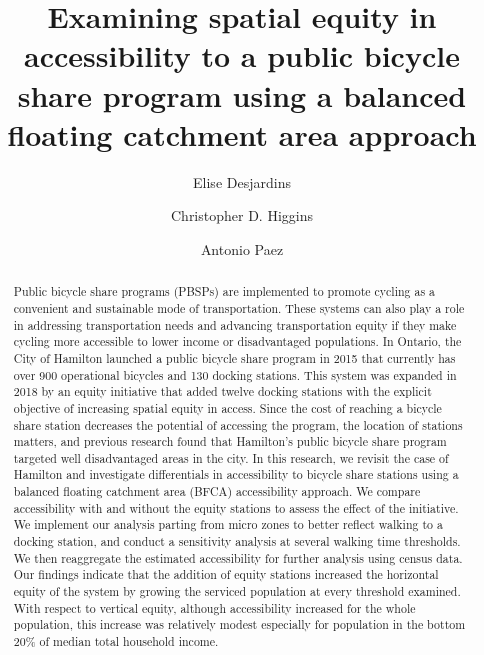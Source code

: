\documentclass[]{elsarticle} %
\begin{document}
\begin{frontmatter}

  \title{Examining spatial equity in accessibility to a public bicycle share
program using a balanced floating catchment area approach}
    \author[McMaster University]{Elise Desjardins}
    \author[University of Toronto Scarborough]{Christopher D. Higgins}
    \author[McMaster University]{Antonio Paez}
      \address[McMaster University]{School of Earth, Environment \& Society, 1280 Main Street West,
Hamilton, ON L8S4L8}
    \address[University of Toronto Scarborough]{Department of Geography \& Planning, 1265 Military Trail, Toronto, ON
M1C1A4}
  
  \begin{abstract}
  Public bicycle share programs (PBSPs) are implemented to promote cycling
  as a convenient and sustainable mode of transportation. These systems
  can also play a role in addressing transportation needs and advancing
  transportation equity if they make cycling more accessible to lower
  income or disadvantaged populations. In Ontario, the City of Hamilton
  launched a public bicycle share program in 2015 that currently has over
  900 operational bicycles and 130 docking stations. This system was
  expanded in 2018 by an equity initiative that added twelve docking
  stations with the explicit objective of increasing spatial equity in
  access. Since the cost of reaching a bicycle share station decreases the
  potential of accessing the program, the location of stations matters,
  and previous research found that Hamilton's public bicycle share program
  targeted well disadvantaged areas in the city. In this research, we
  revisit the case of Hamilton and investigate differentials in
  accessibility to bicycle share stations using a balanced floating
  catchment area (BFCA) accessibility approach. We compare accessibility
  with and without the equity stations to assess the effect of the
  initiative. We implement our analysis parting from micro zones to better
  reflect walking to a docking station, and conduct a sensitivity analysis
  at several walking time thresholds. We then reaggregate the estimated
  accessibility for further analysis using census data. Our findings
  indicate that the addition of equity stations increased the horizontal
  equity of the system by growing the serviced population at every
  threshold examined. With respect to vertical equity, although
  accessibility increased for the whole population, this increase was
  relatively modest especially for population in the bottom 20\% of median
  total household income.
  \end{abstract}
  
 \end{frontmatter}
\end{document}
